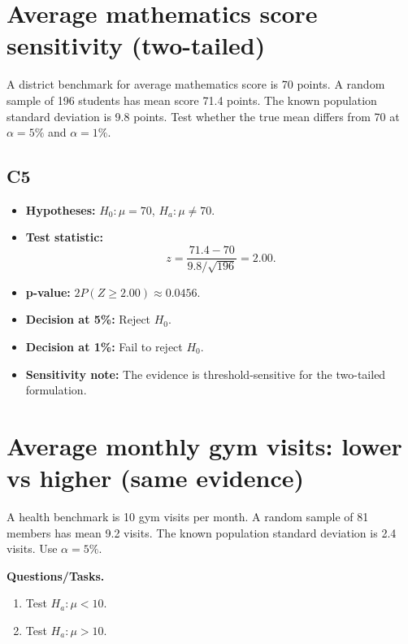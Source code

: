 \begin{center}
\hspace{0.8cm}
\end{center}

\section{Average mathematics score sensitivity (two-tailed)}
A district benchmark for average mathematics score is 70 points. A random sample of 196 students has mean score 71.4 points. The known population standard deviation is 9.8 points. Test whether the true mean differs from 70 at \(\alpha=5\%\) and \(\alpha=1\%\).

\subsection*{C5}
\begin{itemize}
    \item \textbf{Hypotheses:} \(H_0\colon \mu=70\), \(H_a\colon \mu\ne70\).
    \item \textbf{Test statistic:}
    \[
    z=\frac{71.4-70}{9.8/\sqrt{196}}=2.00.
    \]
    \item \textbf{p-value:} \(2P(Z\ge2.00)\approx0.0456\).
    \item \textbf{Decision at 5\%:} Reject \(H_0\).
    \item \textbf{Decision at 1\%:} Fail to reject \(H_0\).
    \item \textbf{Sensitivity note:} The evidence is threshold-sensitive for the two-tailed formulation.
\end{itemize}

\begin{center}
\hspace{0.8cm}
\end{center}

\section{Average monthly gym visits: lower vs higher (same evidence)}
A health benchmark is 10 gym visits per month. A random sample of 81 members has mean 9.2 visits. The known population standard deviation is 2.4 visits. Use \(\alpha=5\%\).

\textbf{Questions/Tasks.}
\begin{enumerate}
    \item[(a)] Test \(H_a\colon \mu<10\).
    \item[(b)] Test \(H_a\colon \mu>10\).
\end{enumerate}

